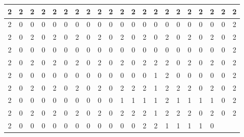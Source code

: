 			\begin{center}
				\begin{tabular}{|c|c|c|c|c|c|c|c|c|c|c|c|c|c|c|c|c|c|c|c|c|} \hline
				\rowcolor{cyan} 2 & 2 & 2 & 2 & 2 & 2 & 2 & 2 & 2 & 2 & 2 & 2 & 2 & 2 & 2 & 2 & 2 & 2 & 2 & 2 & 2 \\\hline
				\cellcolor{cyan}2 & 0 & 0 & 0 & 0 & 0 & 0 & 0 & 0 & 0 & 0 & 0 & 0 & 0 & 0 & 0 & 0 & 0 & 0 & 0 & \cellcolor{cyan}2 \\\hline
				\cellcolor{cyan}2 & 0 & \cellcolor{cyan}\cellcolor{cyan}2 & 0 & \cellcolor{cyan}2 & 0 & \cellcolor{cyan}2 & 0 & \cellcolor{cyan}2 & 0 & \cellcolor{cyan}2 & 0 & \cellcolor{cyan}2 & 0 & \cellcolor{cyan}2 &
				0 & \cellcolor{cyan}2 & 0 & \cellcolor{cyan}2 & 0 & \cellcolor{cyan}2 \\\hline \cellcolor{cyan}2 & 0 & 0 & 0 & 0 & 0 & 0 & 0 & 0 & 0 & 0 & 0 & 0 & 0 & 0 & 0 & 0 & 0 & 0 & 0 & \cellcolor{cyan}2 \\\hline
				\cellcolor{cyan}2 & 0 & \cellcolor{cyan}2 & 0 & \cellcolor{cyan}2 & 0 & \cellcolor{cyan}2 & 0 & \cellcolor{cyan}2 & 0 & \cellcolor{cyan}2 & 0 & \cellcolor{cyan}2 & \cellcolor{cyan}2 & \cellcolor{cyan}2 & 0 & \cellcolor{cyan}2 & 0 & \cellcolor{cyan}2 & 0 & \cellcolor{cyan}2 \\\hline
				\cellcolor{cyan}2 & 0 & 0 & 0 & 0 & 0 & 0 & 0 & 0 & 0 & 0 & 0 & 0 & \cellcolor{red}1 & \cellcolor{cyan}2 & 0 & 0 & 0 & 0 & 0 & \cellcolor{cyan}2 \\\hline
				\cellcolor{cyan}2 & 0 & \cellcolor{cyan}2 & 0 & \cellcolor{cyan}2 & 0 & \cellcolor{cyan}2 & 0 & \cellcolor{cyan}2 & 0 & \cellcolor{cyan}2 & \cellcolor{cyan}2 & \cellcolor{cyan}2 & \cellcolor{red}1 & \cellcolor{cyan}2 & \cellcolor{cyan}2 & \cellcolor{cyan}2 & 0 & \cellcolor{cyan}2 & 0 & \cellcolor{cyan}2 \\\hline
				\cellcolor{cyan}2 & 0 & 0 & 0 & 0 & 0 & 0 & 0 & 0 & 0 & \cellcolor{red}1 & \cellcolor{red}1 & \cellcolor{red}1 & \cellcolor{red}1 &	\cellcolor{gray}2 & \cellcolor{red}1 & \cellcolor{red}1 & \cellcolor{red}1 & \cellcolor{red}1 & 0 & \cellcolor{cyan}2 \\\hline
				\cellcolor{cyan}2 & 0 & \cellcolor{cyan}2 & 0 & \cellcolor{cyan}2 & 0 & \cellcolor{cyan}2 & 0 & \cellcolor{cyan}2 & 0 & \cellcolor{cyan}2 & \cellcolor{cyan}2 & \cellcolor{cyan}2 & \cellcolor{red}1 & \cellcolor{cyan}2 & \cellcolor{cyan}2 & \cellcolor{cyan}2 & 0 & \cellcolor{cyan}2 & 0 & \cellcolor{cyan}2 \\\hline
				\cellcolor{cyan}2 & 0 & 0 & 0 & 0 & 0 & 0 & 0 & 0 & 0 & 0 & 0 & \cellcolor{cyan}2 & \cellcolor{gray}2 & \cellcolor{red}1 & \cellcolor{red}1 & \cellcolor{red}1 & \cellcolor{red}1 & 0 &

\end{tabular}
\end{center}
